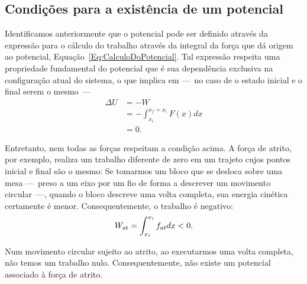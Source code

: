 \subsection{Condições para a existência de um potencial}

Identificamos anteriormente que o potencial pode ser definido através da expressão para o cálculo do trabalho através da integral da força que dá origem ao potencial, Equação~\eqref{Eq:CalculoDoPotencial}. Tal expressão respeita uma propriedade fundamental do potencial que é sua dependência exclusiva na configuração atual do sistema, o que implica em ---~no caso de o estado inicial e o final serem o mesmo~---
\begin{align}
  \Delta U &= - W \\
  &= -\int_{x_i}^{x_f=x_i} F(x) dx \\
  &= 0.
\end{align}

Entretanto, nem todas as forças respeitam a condição acima. A força de atrito, por exemplo, realiza um trabalho diferente de zero em um trajeto cujos pontos inicial e final são o mesmo: Se tomarmos um bloco que se desloca sobre uma mesa ---~preso a um eixo por um fio de forma a descrever um movimento circular~---, quando o bloco descreve uma volta completa, sua energia cinética certamente é menor. Consequentemente, o trabalho é negativo:
\begin{equation}
  W_{\rm{at}} = \int_{x_i}^{x_i} f_{at} dx < 0.
\end{equation}

\begin{marginfigure}[-5cm]
\centering
{}
\caption{Num movimento circular sujeito ao atrito, ao executarmos uma volta completa, não temos um trabalho nulo. Consequentemente, não existe um potencial associado à força de atrito.}
\end{marginfigure}

